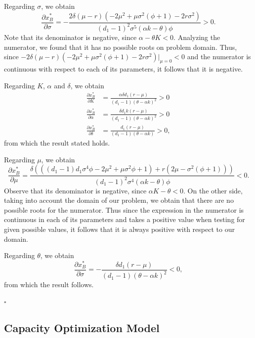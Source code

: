 Regarding $\sigma$, we obtain
$$\frac{\partial x^*_B}{\partial \sigma}=-\frac{2 \delta  (\mu -r) \left(-2 \mu ^2+\mu  \sigma ^2 \left(\phi+1\right)-2 r \sigma ^2\right)}{(d_1-1)^2 \sigma ^5 (\alpha  k-\theta ) \phi}>0.$$
Note that its denominator is negative, since $\alpha-\theta K<0$.
Analyzing the numerator, we found that it has no possible roots on problem domain. Thus, since $-2 \delta  (\mu -r) \left(-2 \mu ^2+\mu  \sigma ^2 \left(\phi+1\right)-2 r \sigma ^2\right) |_{\mu=0}<0$ and the numerator is continuous with respect to each of its parameters, it follows that it is negative.



Regarding $K$, $\alpha$ and $\delta$, we obtain
\begin{align*}
\frac{\partial x^*_B}{\partial K}&=\frac{\alpha  \delta  d_1 (r-\mu )}{(d_1-1) (\theta -\alpha  k)^2}>0\\
\frac{\partial x^*_B}{\partial \alpha}&=\frac{\delta  d_1 k (r-\mu )}{(d_1-1) (\theta -\alpha  k)^2}>0\\
\frac{\partial x^*_B}{\partial \delta}&=\frac{d_1 (r-\mu )}{(d_1-1) (\theta -\alpha  k)}>0,
\end{align*}
from which the result stated holds.


Regarding $\mu$, we obtain
$$\frac{\partial x^*_B}{\partial \mu}=\frac{\delta  \left( \left( (d_1-1) d_1 \sigma ^4 \phi -2 \mu ^2+\mu  \sigma ^2 \phi+1 \right)+r \left(2 \mu -\sigma ^2 \left(\phi+1\right)\right)\right)}{(d_1-1)^2 \sigma ^4 (\alpha  k-\theta ) \phi}<0.$$
Observe that its denominator is negative, since $\alpha K - \theta <0$. On the other side, taking into account the domain of our problem, we obtain that there are no possible roots for the numerator. 
Thus since the expression in the numerator is continuous in each of its parameters and takes a positive value when testing for given possible values, it follows that it is always positive with respect to our domain.

Regarding $\theta$, we obtain
$$\frac{\partial x^*_B}{\partial \sigma}=-\frac{\delta  d_1 (r-\mu )}{(d_1-1) (\theta -\alpha  k)^2}<0,$$
from which the result follows.
 
 
\begin{flushright}
 $\square$
\end{flushright}


\subsection{Capacity Optimization Model}

